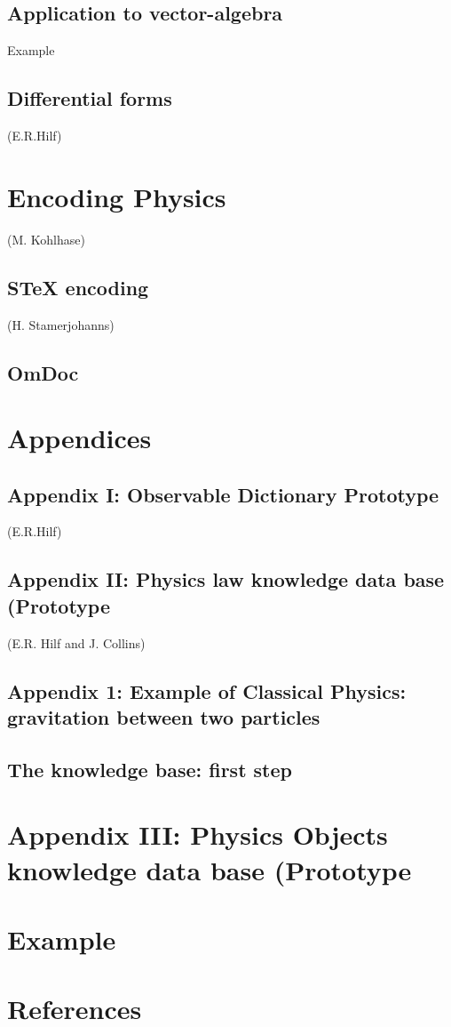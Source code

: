 \documentclass[12pt]{article}
\begin{document}
\subsection{Application to vector-algebra}
Example
\subsection{Differential forms}
(E.R.Hilf)

\section{Encoding Physics }
(M. Kohlhase)
\subsection{STeX encoding}
(H. Stamerjohanns)
\subsection{OmDoc}
\section{Appendices}
\subsection{Appendix I: Observable Dictionary Prototype}
(E.R.Hilf)
\subsection{Appendix II: Physics law knowledge data base (Prototype}
(E.R. Hilf and J. Collins)
\subsection{Appendix 1: Example of Classical Physics: gravitation between two particles}
\subsection{The knowledge base: first step}
\section{Appendix III: Physics Objects knowledge data base (Prototype}
\section{Example}
\section{References}
\begin{small}
\end{small}
\end{document}

